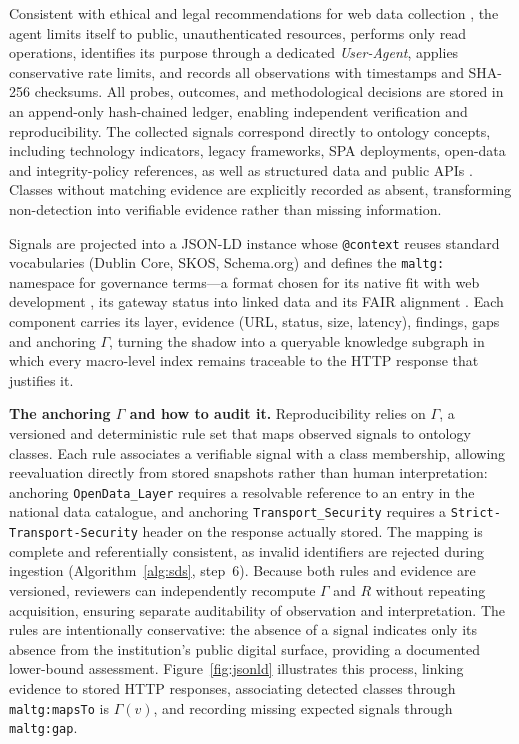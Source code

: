 \documentclass[engproc,proceedingpaper,submit,moreauthors]{Definitions/mdpi}
\begin{document}
    Consistent with ethical and legal recommendations for web data collection \cite{Krotov2020}, the agent limits itself to public, unauthenticated resources, performs only read operations, identifies its purpose through a dedicated \emph{User-Agent}, applies conservative rate limits, and records all observations with timestamps and SHA-256 checksums. All probes, outcomes, and methodological decisions are stored in an append-only hash-chained ledger, enabling independent verification and reproducibility. The collected signals correspond directly to ontology concepts, including technology indicators, legacy frameworks, SPA deployments, open-data and integrity-policy references, as well as structured data and public APIs \cite{Guha2016}. Classes without matching evidence are explicitly recorded as absent, transforming non-detection into verifiable evidence rather than missing information.

        Signals are projected into a JSON-LD instance whose \texttt{@context} reuses standard vocabularies (Dublin Core, SKOS, Schema.org) and defines the \texttt{maltg:} namespace for governance terms---a format chosen for its native fit with web development \cite{Guha2016}, its gateway status into linked data \cite{Bizer2009} and its FAIR alignment \cite{Wilkinson2016}. Each component carries its layer, evidence (URL, status, size, latency), findings, gaps and anchoring $\Gamma$, turning the shadow into a queryable knowledge subgraph \cite{Hogan2021} in which every macro-level index remains traceable to the HTTP response that justifies it.

    \textbf{The anchoring $\Gamma$ and how to audit it.}
    Reproducibility relies on $\Gamma$, a versioned and deterministic rule set that maps observed signals to ontology classes. Each rule associates a verifiable signal with a class membership, allowing reevaluation directly from stored snapshots rather than human interpretation: anchoring \texttt{OpenData\_Layer} requires a resolvable reference to an entry in the national data catalogue, and anchoring \texttt{Transport\_Security} requires a \texttt{Strict-Transport-Security} header on the response actually stored. The mapping is complete and referentially consistent, as invalid identifiers are rejected during ingestion (Algorithm~\ref{alg:sds}, step~6). Because both rules and evidence are versioned, reviewers can independently recompute $\Gamma$ and $R$ without repeating acquisition, ensuring separate auditability of observation and interpretation. The rules are intentionally conservative: the absence of a signal indicates only its absence from the institution's public digital surface, providing a documented lower-bound assessment. Figure~\ref{fig:jsonld} illustrates this process, linking evidence to stored HTTP responses, associating detected classes through \texttt{maltg:mapsTo} is $\Gamma(v)$, and recording missing expected signals through \texttt{maltg:gap}.
\end{document}
